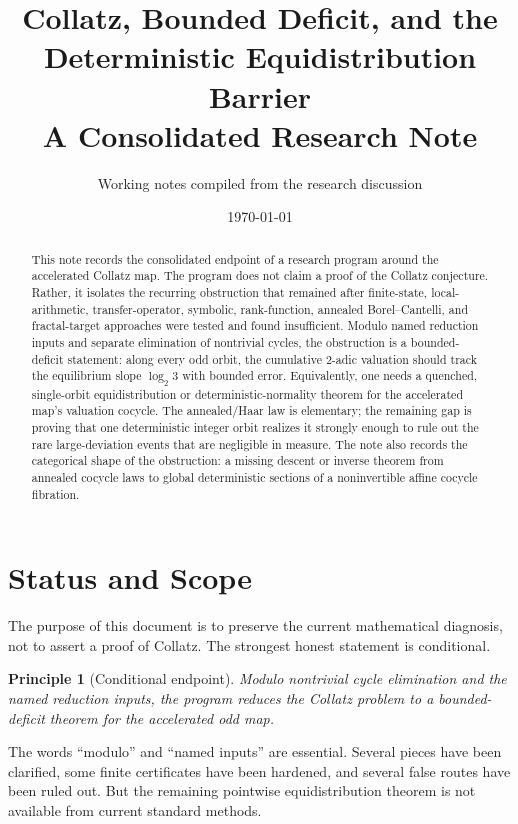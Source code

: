 \documentclass[11pt]{article}
\title{Collatz, Bounded Deficit, and the Deterministic Equidistribution Barrier\\
\large A Consolidated Research Note}
\author{Working notes compiled from the research discussion}
\date{\today}
\newtheorem{principle}{Principle}
\begin{document}
\maketitle

\begin{abstract}
This note records the consolidated endpoint of a research program around the accelerated Collatz map.  The program does not claim a proof of the Collatz conjecture.  Rather, it isolates the recurring obstruction that remained after finite-state, local-arithmetic, transfer-operator, symbolic, rank-function, annealed Borel--Cantelli, and fractal-target approaches were tested and found insufficient.  Modulo named reduction inputs and separate elimination of nontrivial cycles, the obstruction is a bounded-deficit statement: along every odd orbit, the cumulative $2$-adic valuation should track the equilibrium slope $\log_2 3$ with bounded error.  Equivalently, one needs a quenched, single-orbit equidistribution or deterministic-normality theorem for the accelerated map's valuation cocycle.  The annealed/Haar law is elementary; the remaining gap is proving that one deterministic integer orbit realizes it strongly enough to rule out the rare large-deviation events that are negligible in measure.  The note also records the categorical shape of the obstruction: a missing descent or inverse theorem from annealed cocycle laws to global deterministic sections of a noninvertible affine cocycle fibration.
\end{abstract}

\tableofcontents

\section{Status and Scope}

The purpose of this document is to preserve the current mathematical diagnosis, not to assert a proof of Collatz.  The strongest honest statement is conditional.

\begin{principle}[Conditional endpoint]
Modulo nontrivial cycle elimination and the named reduction inputs, the program reduces the Collatz problem to a bounded-deficit theorem for the accelerated odd map.
\end{principle}

The words ``modulo'' and ``named inputs'' are essential.  Several pieces have been clarified, some finite certificates have been hardened, and several false routes have been ruled out.  But the remaining pointwise equidistribution theorem is not available from current standard methods.
\end{document}
